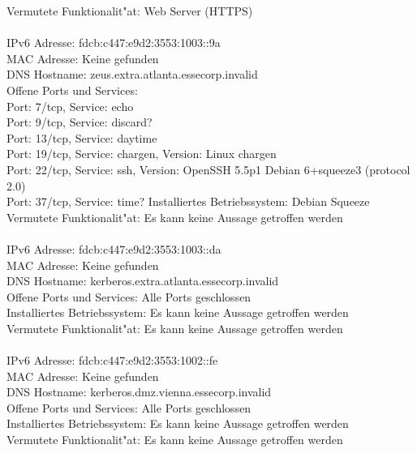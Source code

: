 \documentclass[12pt,a4paper,titlepage,oneside]{scrartcl}
\begin{document}
Vermutete Funktionalit"at: Web Server (HTTPS)\\
\\
IPv6 Adresse: fdcb:c447:e9d2:3553:1003::9a\\
MAC Adresse: Keine gefunden\\
DNS Hostname: zeus.extra.atlanta.essecorp.invalid\\
Offene Ports und Services:\\
Port: 7/tcp, Service: echo\\
Port: 9/tcp, Service: discard?\\
Port: 13/tcp, Service: daytime\\
Port: 19/tcp, Service: chargen, Version: Linux chargen\\
Port: 22/tcp, Service: ssh, Version: OpenSSH 5.5p1 Debian 6+squeeze3 (protocol 2.0)\\
Port: 37/tcp, Service: time?
Installiertes Betriebssystem: Debian Squeeze\\
Vermutete Funktionalit"at: Es kann keine Aussage getroffen werden\\
\\
IPv6 Adresse: fdcb:c447:e9d2:3553:1003::da\\
MAC Adresse: Keine gefunden\\
DNS Hostname: kerberos.extra.atlanta.essecorp.invalid\\
Offene Ports und Services: Alle Ports geschlossen\\
Installiertes Betriebssystem: Es kann keine Aussage getroffen werden\\
Vermutete Funktionalit"at: Es kann keine Aussage getroffen werden\\
\\
IPv6 Adresse: fdcb:c447:e9d2:3553:1002::fe\\
MAC Adresse: Keine gefunden\\
DNS Hostname: kerberos.dmz.vienna.essecorp.invalid\\
Offene Ports und Services: Alle Ports geschlossen\\
Installiertes Betriebssystem: Es kann keine Aussage getroffen werden\\
Vermutete Funktionalit"at: Es kann keine Aussage getroffen werden\\
\end{document}
